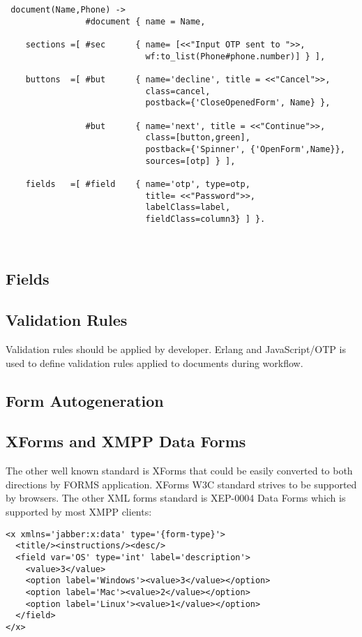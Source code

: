 \vspace{1\baselineskip}
\begin{lstlisting}
 document(Name,Phone) ->
                #document { name = Name,

    sections =[ #sec      { name= [<<"Input OTP sent to ">>,
                            wf:to_list(Phone#phone.number)] } ],

    buttons  =[ #but      { name='decline', title = <<"Cancel">>,
                            class=cancel,
                            postback={'CloseOpenedForm', Name} },

                #but      { name='next', title = <<"Continue">>,
                            class=[button,green],
                            postback={'Spinner', {'OpenForm',Name}},
                            sources=[otp] } ],

    fields   =[ #field    { name='otp', type=otp,
                            title= <<"Password">>,
                            labelClass=label,
                            fieldClass=column3} ] }.
\end{lstlisting}

\

\subsection{Fields}

\subsection{Validation Rules}
Validation rules should be applied by developer.
Erlang and JavaScript/OTP is used to define validation
rules applied to documents during workflow.

\subsection{Form Autogeneration}

\subsection{XForms and XMPP Data Forms}
The other well known standard is XForms that could be easily converted
to both directions by FORMS application. XForms W3C standard strives to be supported by browsers.
The other XML forms standard is XEP-0004 Data Forms which is supported by most XMPP clients:

\vspace{1\baselineskip}
\begin{lstlisting}
<x xmlns='jabber:x:data' type='{form-type}'>
  <title/><instructions/><desc/>
  <field var='OS' type='int' label='description'>
    <value>3</value>
    <option label='Windows'><value>3</value></option>
    <option label='Mac'><value>2</value></option>
    <option label='Linux'><value>1</value></option>
  </field>
</x>
\end{lstlisting}
